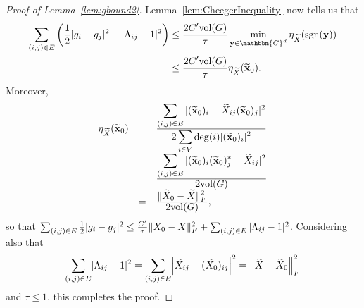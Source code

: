 \begin{proof}[Proof of Lemma~\ref{lem:gbound2}]
Lemma~\ref{lem:CheegerInequality} now tells us that 
\begin{equation} \begin{aligned} \sum_{(i, j) \in E}  \left(\frac{1}{2} |g_i - g_j|^2 - |\Lambda_{ij} - 1|^2\right) &\le \bigfrac{2 C' \vol(G)}{\tau} \min_{{\bf y} \in \mathbbm{C}^d} \eta_{\tX}( \sgn({\bf y}) ) \\&\le \bigfrac{2C' \vol(G)}{\tau} \eta_{\tX}(\tx_0).\end{aligned} \label{eq:de-cheeg} \end{equation}
Moreover,%
$$\begin{array}{rcl}%
\eta_{\tX}(\tx_0) & = & \bigfrac{\sum_{(i, j) \in E} |(\tx_0)_i - \tX_{ij} (\tx_0)_j |^2}{2 \sum_{i \in V} \deg(i) |(\tx_0)_i|^2} \\%
& = & \bigfrac{\sum_{(i, j) \in E} |(\tx_0)_i (\tx_0)^*_j - \tX_{ij}|^2}{2 \vol(G)} \\%
& = & \bigfrac{ \| \widetilde{\X}_0 - \tX \|_F^2}{2 \vol(G)},%
\end{array}$$%
so that $\sum_{(i, j) \in E} \frac{1}{2} |g_i - g_j|^2 \le \frac{C'}{\tau} \lVert X_0 - X \rVert^2_F + \sum_{(i, j) \in E} |\Lambda_{ij} - 1|^2$.  Considering also that \begin{equation} \sum_{(i, j) \in E} \abs{\Lambda_{ij} - 1}^2 = \sum_{(i, j) \in E} \abs*{\tX_{ij} - (\tX_0)_{ij}}^2 = \norm*{\tX - \tX_0}_F^2 \label{eq:Lamb=Frob}\end{equation} and $\tau \le 1$, this completes the proof.
\end{proof}



